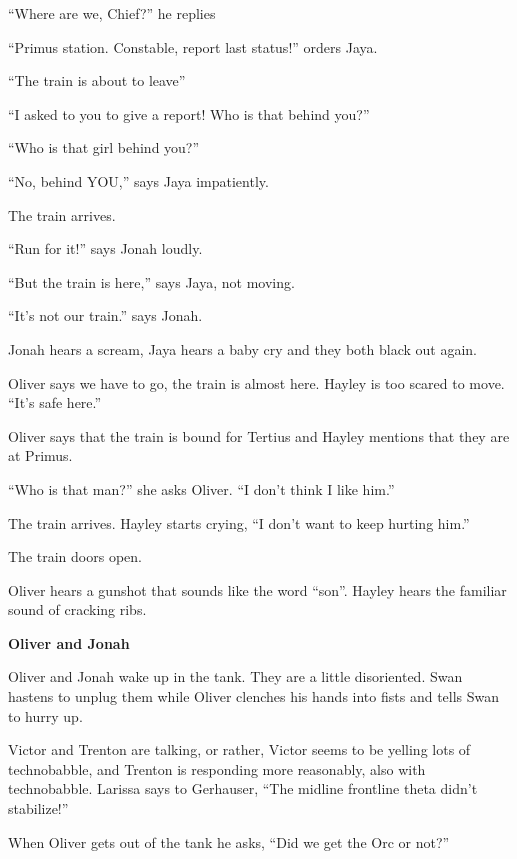 ``Where are we, Chief?'' he replies

``Primus station.  Constable, report last status!'' orders Jaya.

``The train is about to leave''

``I asked to you to give a report!   Who is that behind you?''

``Who is that girl behind you?''

``No, behind YOU,'' says Jaya impatiently.

The train arrives.

``Run for it!'' says Jonah loudly.

``But the train is here,'' says Jaya, not moving.

``It's not our train.'' says Jonah.

Jonah hears a scream, Jaya hears a baby cry and they both black out again.



Oliver says we have to go, the train is almost here.   Hayley is too scared to move.  ``It's safe here.''

Oliver says that the train is bound for Tertius and Hayley mentions that they are at Primus.

``Who is that man?'' she asks Oliver.  ``I don't think I like him.''  

The train arrives.  Hayley starts crying, ``I don't want to keep hurting him.''

The train doors open.

Oliver hears a gunshot that sounds like the word ``son''.  Hayley hears the familiar sound of cracking ribs.



\textbf{Oliver and Jonah}



Oliver and Jonah wake up in the tank.  They are a little disoriented.  Swan hastens to unplug them while Oliver clenches his hands into fists and tells Swan to hurry up.



Victor and Trenton are talking, or rather, Victor seems to be yelling lots of technobabble, and Trenton is responding more reasonably, also with technobabble.  Larissa says to Gerhauser, ``The midline frontline theta didn't stabilize!''

 

When Oliver gets out of the tank he asks, ``Did we get the Orc or not?''

